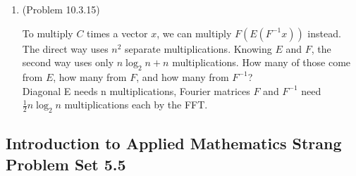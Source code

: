 \documentclass[a4paper]{article}
\begin{document}
\begin{enumerate}
\item{(Problem 10.3.15)}

To multiply $C$ times a vector $x$, we can multiply $F (E (F^{-1} x ))$ 
instead. The direct way uses $n^2$ separate multiplications. Knowing $E$ and $F$, the 
second way uses only $n \log_2 n + n$ multiplications. How many of those come from 
$E$, how many from $F$, and how many from $F^{-1}$?\\

Diagonal E needs n multiplications, Fourier matrices $F$ and $F^{-1}$ need $\frac{1}{2}n \log_2 n$ multiplications each by the FFT.

\end{enumerate}

\subsection*{Introduction to Applied Mathematics Strang Problem Set 5.5}
\end{document}
